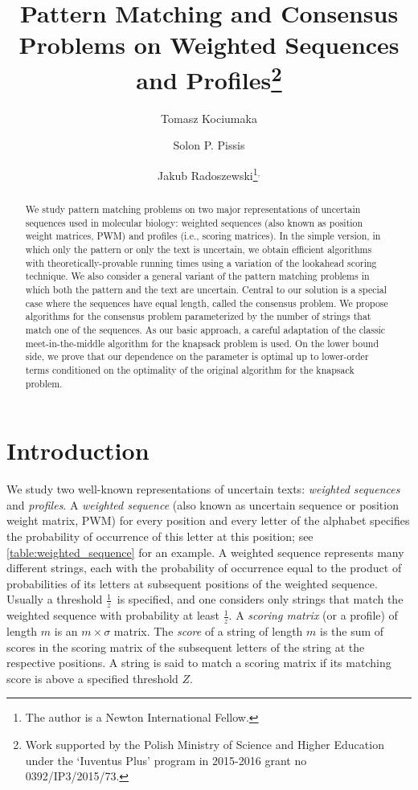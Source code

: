 \documentclass{article}
\title{Pattern Matching and Consensus Problems on Weighted Sequences and Profiles\footnote{Work supported by the Polish Ministry of Science and Higher Education under the `Iuventus Plus' program in 2015-2016 grant no 0392/IP3/2015/73.}}
\author[1]{Tomasz Kociumaka}
\author[2]{Solon P. Pissis}
\author[1,2]{Jakub Radoszewski\footnote{The author is a Newton International Fellow.}$^{,}$}
\affil[1]{Institute of Informatics, University of Warsaw, Warsaw, Poland\\
    \texttt{[kociumaka,jrad]@mimuw.edu.pl}}
\affil[2]{Department of Informatics, King's College London, London, UK\\
    \texttt{solon.pissis@kcl.ac.uk}
}
\date{\vspace{-5ex}}
\theoremstyle{plain}
\theoremstyle{definition}
\newcommand{\fr}{\ensuremath{\frac1z}}
\begin{document}
  \maketitle
\begin{abstract}
  We study pattern matching problems on two major representations of uncertain sequences used in molecular biology:
  weighted sequences (also known as position weight matrices, PWM) and profiles (i.e., scoring matrices).
  In the simple version, in which only the pattern or only the text is uncertain, 
  we obtain efficient algorithms with theoretically-provable running times using a variation of the lookahead scoring technique.
  We also consider a general variant of the pattern matching problems in which both the pattern and the text are uncertain.
  Central to our solution is a special case where the sequences have equal length, called the consensus problem.
  We propose algorithms for the consensus problem parameterized by the number of strings that match one of the sequences.
  As our basic approach, a careful adaptation of the classic meet-in-the-middle algorithm for the knapsack problem is used.
  On the lower bound side, we prove that our dependence on the parameter is optimal up to lower-order terms
  conditioned on the optimality of the original algorithm for the knapsack problem.
\end{abstract}

  \section{Introduction}
  We study two well-known representations of uncertain texts: \emph{weighted sequences} and \emph{profiles}.
  A \emph{weighted sequence} (also known as uncertain sequence or position weight matrix, PWM)
  for every position and every letter of the alphabet specifies the probability of occurrence of this letter at this position;
  see \cref{table:weighted_sequence} for an example.
  A weighted sequence represents many different strings, each with the probability
  of occurrence equal to the product of probabilities of its letters at subsequent positions of the weighted sequence.
  Usually a threshold \fr\ is specified, and one considers only strings that match the weighted sequence with probability at least \fr.
  A \emph{scoring matrix} (or a profile) of length $m$ is an $m \times \sigma$ matrix.
  The \emph{score} of a string of length $m$ is the sum of scores in the scoring matrix of the subsequent
  letters of the string at the respective positions.
  A string is said to match a scoring matrix if its matching score is above a specified threshold $Z$.
\end{document}
